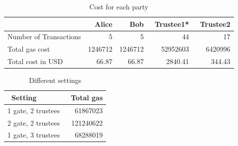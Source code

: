 \begin{table}[]
		\centering
	\begin{tabular}{|l|r|r|r|r|}
		\hline
		& ~\textbf{Alice} &  ~\textbf{Bob} & ~\textbf{Trustee1*}  & ~\textbf{Trustee2}  \\ \hline
		Number of Transactions	& 5 &5  &44  &17  \\ \hline
		Total gas cost	& 1246712 &  1246712& 52952603  & 6420996 \\ \hline
		Total cost in USD	&  66.87& 66.87 &2840.41  & 344.43 \\ \hline
	\end{tabular}
	\caption{Cost for each party} 
\end{table}

\begin{table}[]
		\centering
	\begin{tabular}{|l|r|}
	\hline
	~\textbf{Setting}	& ~\textbf{Total gas}  \\ \hline
	1 gate, 2 trustees	& 61867023  \\ \hline
	2 gate, 2 trustees	&  121240622 \\ \hline
	1 gate, 3 trustees	& 68288019 \\ \hline
\end{tabular}
	\caption{Different settings}
\end{table}


